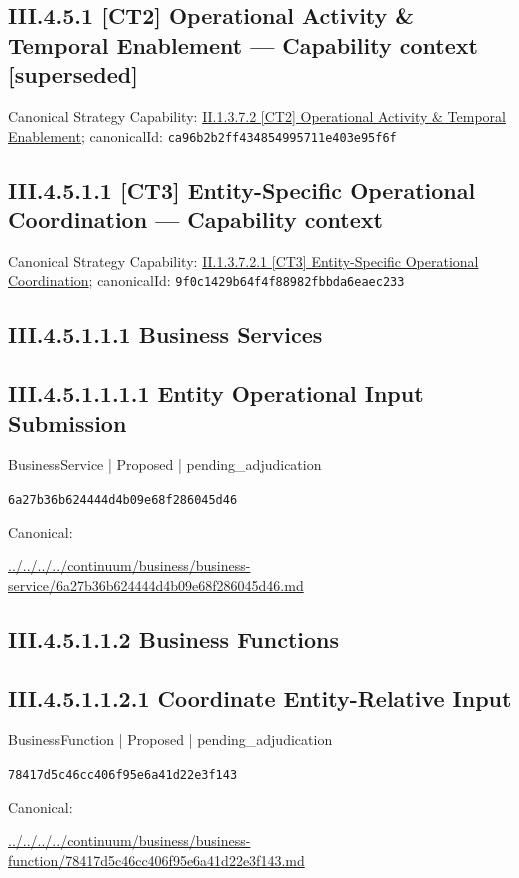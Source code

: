 \documentclass[10pt,a4paper]{article}
\begin{document}
\subsection*{III.4.5.1 [CT2] Operational Activity \& Temporal Enablement — Capability context [superseded]}
Canonical Strategy Capability: \hyperref[element-ca96b2b2ff434854995711e403e95f6f]{II.1.3.7.2 [CT2] Operational Activity \& Temporal Enablement}; canonicalId: \texttt{ca96b2b2ff434854995711e403e95f6f}\par
\subsection*{III.4.5.1.1 [CT3] Entity-Specific Operational Coordination — Capability context}
Canonical Strategy Capability: \hyperref[element-9f0c1429b64f4f88982fbbda6eaec233]{II.1.3.7.2.1 [CT3] Entity-Specific Operational Coordination}; canonicalId: \texttt{9f0c1429b64f4f88982fbbda6eaec233}\par
\subsection*{III.4.5.1.1.1 Business Services}
\subsection*{III.4.5.1.1.1.1 Entity Operational Input Submission}
\label{element-6a27b36b624444d4b09e68f286045d46}
{\small BusinessService | Proposed | pending\_adjudication}\par
\texttt{6a27b36b624444d4b09e68f286045d46}\par
Canonical: \par
{\footnotesize\url{../../../../continuum/business/business-service/6a27b36b624444d4b09e68f286045d46.md}}\par
\subsection*{III.4.5.1.1.2 Business Functions}
\subsection*{III.4.5.1.1.2.1 Coordinate Entity-Relative Input}
\label{element-78417d5c46cc406f95e6a41d22e3f143}
{\small BusinessFunction | Proposed | pending\_adjudication}\par
\texttt{78417d5c46cc406f95e6a41d22e3f143}\par
Canonical: \par
{\footnotesize\url{../../../../continuum/business/business-function/78417d5c46cc406f95e6a41d22e3f143.md}}\par
\end{document}
